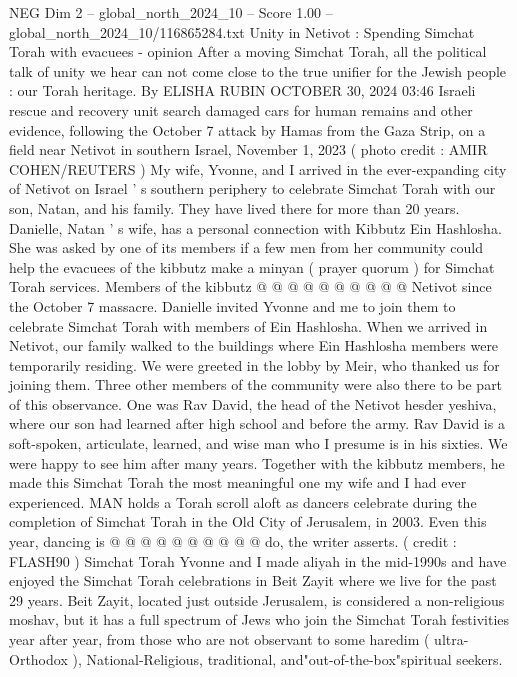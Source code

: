\begin{textsample}{NEG Dim 2 – global\_north\_2024\_10 – Score 1.00 – global\_north\_2024\_10/116865284.txt}  \label{ex:f2_neg_365}
Unity in Netivot : Spending Simchat Torah with evacuees - opinion After a moving Simchat Torah, all the political talk of unity we hear can not come close to the true unifier for the Jewish people : our Torah heritage.
By ELISHA RUBIN OCTOBER 30, 2024 03:46 Israeli rescue and recovery unit search damaged cars for human remains and other evidence, following the October 7 attack by Hamas from the Gaza Strip, on a field near Netivot in southern Israel, November 1, 2023 ( photo credit : AMIR COHEN/REUTERS ) My wife, Yvonne, and I arrived in the ever-expanding city of Netivot on Israel ' s southern periphery to celebrate Simchat Torah with our son, Natan, and his family.
They have lived there for more than 20 years.
Danielle, Natan ' s wife, has a personal connection with Kibbutz Ein Hashlosha.
She was asked by one of its members if a few men from her community could help the evacuees of the kibbutz make a minyan ( prayer quorum ) for Simchat Torah services.
Members of the kibbutz @ @ @ @ @ @ @ @ @ @ Netivot since the October 7 massacre.
Danielle invited Yvonne and me to join them to celebrate Simchat Torah with members of Ein Hashlosha.
When we arrived in Netivot, our family walked to the buildings where Ein Hashlosha members were temporarily residing.
We were greeted in the lobby by Meir, who thanked us for joining them.
Three other members of the community were also there to be part of this observance.
One was Rav David, the head of the Netivot hesder yeshiva, where our son had learned after high school and before the army.
Rav David is a soft-spoken, articulate, learned, and wise man who I presume is in his sixties.
We were happy to see him after many years.
Together with the kibbutz members, he made this Simchat Torah the most meaningful one my wife and I had ever experienced.
MAN holds a Torah scroll aloft as dancers celebrate during the completion of Simchat Torah in the Old City of Jerusalem, in 2003.
Even this year, dancing is @ @ @ @ @ @ @ @ @ @ do, the writer asserts. ( credit : FLASH90 ) Simchat Torah Yvonne and I made aliyah in the mid-1990s and have enjoyed the Simchat Torah celebrations in Beit Zayit where we live for the past 29 years.
Beit Zayit, located just outside Jerusalem, is considered a non-religious moshav, but it has a full spectrum of Jews who join the Simchat Torah festivities year after year, from those who are not observant to some haredim ( ultra-Orthodox ), National-Religious, traditional, and"out-of-the-box"spiritual seekers.

\end{textsample}
